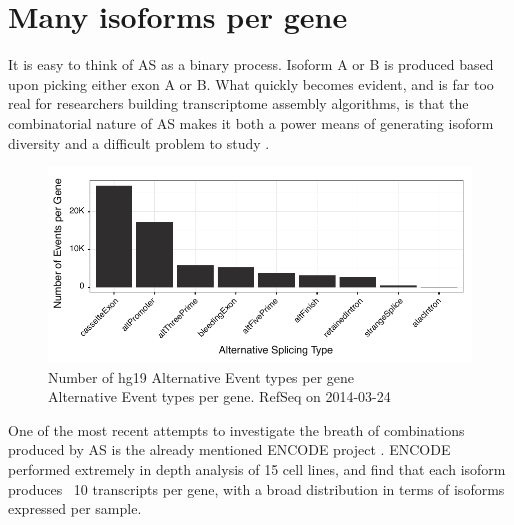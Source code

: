 

\section{Many isoforms per gene}\label{sec:IsoformsPerGene}

It is easy to think of AS as a binary process. Isoform A or B is produced based upon picking either exon A or B. What quickly becomes evident, and is far too real for researchers building transcriptome assembly algorithms, is that the combinatorial nature of AS makes it both a power means of generating isoform diversity and a difficult problem to study \citep{Trapnell2012a}.
 
\begin{figure}[htbp]
	\centering 
	\includegraphics{Figures/ASEventTypesPlot.pdf}
	\caption[Number of hg19 Alternative Event types per gene]
	{
		Number of hg19 Alternative Event types per gene\\[0.25cm]
		Alternative Event types per gene. RefSeq on 2014-03-24
	}
	\label{fig:asEventsBarChart}
\end{figure}

One of the most recent attempts to investigate the breath of combinations produced by AS is the already mentioned ENCODE project \citep{Djebali2012}. ENCODE performed extremely in depth analysis of 15 cell lines, and find that each isoform produces ~10 transcripts per gene, with a broad distribution in terms of isoforms expressed per sample. 


